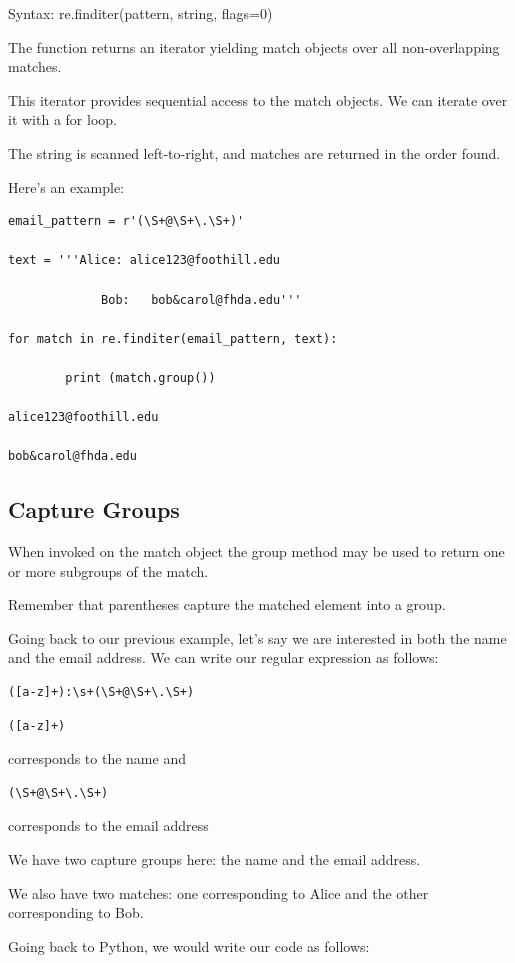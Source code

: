 \documentclass{article}
\begin{document}
Syntax: re.finditer(pattern, string, flags=0)

The function returns an iterator yielding match objects  over all non-overlapping matches. 

This iterator provides sequential access to the  match objects.  We can iterate over it with a for loop.

The string is scanned left-to-right, and matches are returned in the order found.

Here's an example:

\begin{lstlisting}
email_pattern = r'(\S+@\S+\.\S+)'

text = '''Alice: alice123@foothill.edu

             Bob:   bob&carol@fhda.edu'''

for match in re.finditer(email_pattern, text):

        print (match.group())

alice123@foothill.edu

bob&carol@fhda.edu
\end{lstlisting}
\subsection{Capture Groups}
When invoked on the match object the group method may be used to return one or more subgroups of the match.

Remember that parentheses capture the matched element into a group.

Going back to our previous example, let's say we are interested in both the name and the email address.  We can write our regular expression as follows:

\begin{lstlisting}
([a-z]+):\s+(\S+@\S+\.\S+)
\end{lstlisting}

\begin{lstlisting}
([a-z]+) 
\end{lstlisting}
corresponds to the name and 
\begin{lstlisting}
(\S+@\S+\.\S+)
\end{lstlisting} corresponds to the email address

We have two capture groups here: the name and the email address.

We also have two matches:  one corresponding to Alice and the other corresponding to Bob.

Going back to Python, we would write our code as follows:
\end{document}
